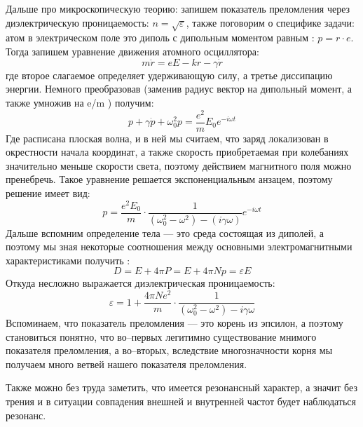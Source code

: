Дальше про микроскопическую теорию: запишем показатель преломления через диэлектрическую проницаемость: $n = \sqrt{\varepsilon}$, также поговорим о специфике задачи: атом в электрическом поле это диполь с дипольным моментом равным : $p = r\cdot e$. Тогда запишем уравнение движения атомного осциллятора:
\begin{equation}
m \ddot{r} = eE - kr - \gamma \dot{r}
\end{equation}
где второе слагаемое определяет удерживающую силу, а третье диссипацию энергии. Немного преобразовав (заменив радиус вектор на дипольный момент, а также умножив на e/m ) получим: 
\begin{equation}
p + \gamma \dot{p} + \omega_{0}^2 p = \frac{e^2}{m}E_0 e^{-i\omega t}
\end{equation}
Где расписана плоская волна, и в ней мы считаем, что заряд локализован в окрестности начала координат, а также скорость приобретаемая при колебаниях значительно меньше скорости света, поэтому действием магнитного поля можно пренебречь. Такое уравнение решается экспоненциальным анзацем, поэтому решение имеет вид:
\begin{equation}
p=\frac{e^{2} E_{0}}{m} \cdot \frac{1}{\left(\omega_{0}^{2}-\omega^{2}\right)-(i \gamma \omega)} e^{-i \omega t}
\end{equation}
Дальше вспомним определение тела --- это среда состоящая из диполей, а поэтому мы зная некоторые соотношения между основными электромагнитными характеристиками получить :
\begin{equation}
D = E + 4 \pi P = E + 4 \pi N p = \varepsilon E
\end{equation}
Откуда несложно выражается диэлектрическая проницаемость:
\begin{equation}\label{eps}
\varepsilon=1+\frac{4 \pi N e^{2}}{m} \cdot \frac{1}{\left(\omega_{0}^{2}-\omega^{2}\right)-i \gamma \omega}
\end{equation}
Вспоминаем, что показатель преломления --- это корень из эпсилон, а поэтому становиться понятно, что во--первых легитимно существование мнимого показателя преломления, а во--вторых, вследствие многозначности корня мы получаем много ветвей нашего показателя преломления.


Также можно без труда заметить, что имеется резонансный характер, а значит без трения и в ситуации совпадения внешней и внутренней частот будет наблюдаться резонанс.

